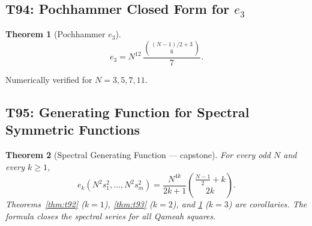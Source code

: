 \documentclass[aip,jmp,reprint,superscriptaddress,floatfix,nofootinbib]{revtex4-2}
\newtheorem{theorem}{Theorem}
\theoremstyle{definition}
\theoremstyle{remark}
\begin{document}
\subsection{T94: Pochhammer Closed Form for \texorpdfstring{$e_3$}{e\_3}}
\label{sec:t94-pochhammer}

\begin{theorem}[Pochhammer $e_3$]
\label{thm:t94}
\[
e_3 = N^{12}\,\frac{\binom{(N-1)/2+3}{6}}{7}.
\]
\end{theorem}

Numerically verified for $N=3,5,7,11$.

\subsection{T95: Generating Function for Spectral Symmetric Functions}
\label{sec:t95-generating-function}

\begin{theorem}[Spectral Generating Function --- capstone]
\label{thm:t95}
For every odd $N$ and every $k\ge 1$,
\[
e_k\!\left(N^2 s_1^2,\ldots,N^2 s_m^2\right)
= \frac{N^{4k}}{2k+1}\binom{\tfrac{N-1}{2}+k}{2k}.
\]
Theorems~\ref{thm:t92} ($k=1$), \ref{thm:t93} ($k=2$), and \ref{thm:t94} ($k=3$) are corollaries.
The formula closes the spectral series for all Qameah squares.
\end{theorem}
\end{document}
